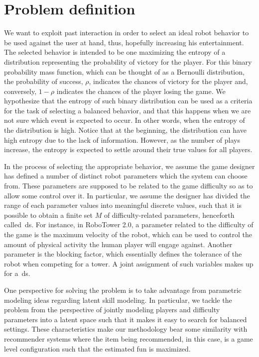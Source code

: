 \section{Problem definition}
We want to exploit past interaction in order to select an ideal robot behavior to be used against the user at hand, thus, hopefully increasing his entertainment. The selected behavior is intended to be one maximizing the entropy of a distribution representing the probability of victory for the player. For this binary probability mass function, which can be thought of as a Bernoulli distribution, the probability of success, $\rho$, indicates the chances of victory for the player and, conversely, $1-\rho$ indicates the chances of the player losing the game. We hypothesize that the entropy of such binary distribution can be used as a criteria for the task of selecting a balanced behavior, and that this happens when we are not sure which event is expected to occur. In other words, when the entropy of the distribution is high. 
Notice that at the beginning, the distribution can have high entropy due to the lack of information. However, as the number of plays increase, the entropy is expected to settle around their true values for all players.

In the process of selecting the appropriate behavior, we assume the game designer has defined a number of distinct robot parameters which the system can choose from. These parameters are supposed to be related to the game difficulty so as to allow some control over it. In particular, we assume the designer has divided the range of each parameter values into meaningful discrete values, such that it is possible to obtain a finite set $M$ of difficulty-related parameters, henceforth called~\gls{ds}. For instance, in RoboTower 2.0, a parameter related to the difficulty of the game is the maximum velocity of the robot, which can be used to control the amount of physical activity the human player will engage against. Another parameter is the blocking factor, which essentially defines the tolerance of the robot when competing for a tower. A joint assignment of such variables makes up for a~\gls{ds}. 

One perspective for solving the problem is to take advantage from parametric modeling ideas regarding latent skill modeling. In particular, we tackle the problem from the perspective of jointly modeling players and difficulty parameters into a latent space such that it makes it easy to search for balanced settings. These characteristics make our methodology bear some similarity with recommender systems where the item being recommended, in this case, is a game level configuration such that the estimated fun is maximized. 

